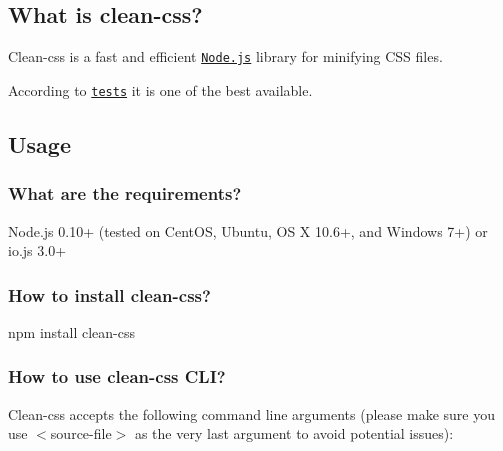 \href{https://www.npmjs.com/package/clean-css}{\tt } \href{https://travis-ci.org/jakubpawlowicz/clean-css}{\tt } \href{https://ci.appveyor.com/project/jakubpawlowicz/clean-css/branch/master}{\tt } \href{https://david-dm.org/jakubpawlowicz/clean-css}{\tt } \href{https://david-dm.org/jakubpawlowicz/clean-css#info=devDependencies}{\tt }

\subsection*{What is clean-\/css?}

Clean-\/css is a fast and efficient \href{http://nodejs.org/}{\tt Node.\+js} library for minifying C\+SS files.

According to \href{http://goalsmashers.github.io/css-minification-benchmark/}{\tt tests} it is one of the best available.

\subsection*{Usage}

\subsubsection*{What are the requirements?}


\begin{DoxyCode}
Node.js 0.10+ (tested on CentOS, Ubuntu, OS X 10.6+, and Windows 7+) or io.js 3.0+
\end{DoxyCode}


\subsubsection*{How to install clean-\/css?}


\begin{DoxyCode}
npm install clean-css
\end{DoxyCode}


\subsubsection*{How to use clean-\/css C\+LI?}

Clean-\/css accepts the following command line arguments (please make sure you use {\ttfamily $<$source-\/file$>$} as the very last argument to avoid potential issues)\+:


